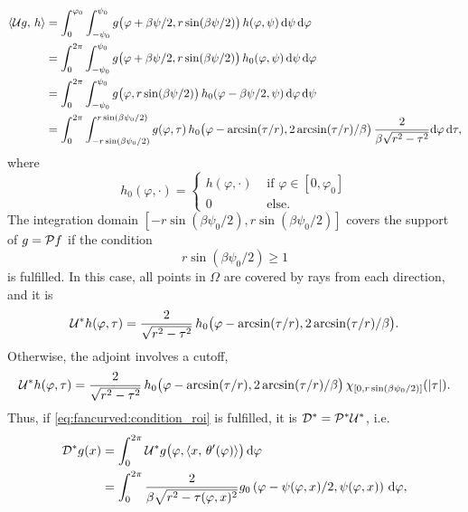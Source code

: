 \documentclass{amsart}
\renewcommand*{\phi}{\varphi}
\begin{document}
%
\begin{align*}
 \INNER{\OPU g}{h} 
 &= \int_0^{\phi_0} \int_{-\psi_0}^{\psi_0} g\big(\phi + \beta\psi/2, r\sin(\beta\psi/2)\big)\, h(\phi, \psi)\, \D\psi\, \D\phi \\
 &= \int_0^{2\pi} \int_{-\psi_0}^{\psi_0} g\big(\phi + \beta\psi/2, r\sin(\beta\psi/2)\big)\, h_0(\phi, \psi)\, \D\psi\, \D\phi \\
 &= \int_0^{2\pi} \int_{-\psi_0}^{\psi_0} g\big(\phi, r\sin(\beta\psi/2)\big)\, h_0(\phi - \beta\psi/2, \psi)\, \D\phi\, \D\psi \\
 &= \int_0^{2\pi} \int_{-r\sin(\beta\psi_0/2)}^{r\sin(\beta\psi_0/2)} g(\phi, \tau)\, h_0\big(\phi - \arcsin(\tau/r), 
 2\arcsin(\tau/r)/\beta\big)\, \frac{2}{\beta\sqrt{r^2-\tau^2}} \D\phi\, \D\tau,
\end{align*}
%
where
%
\begin{equation*}
 h_0(\phi, \cdot) =
 \begin{cases}
  h(\phi, \cdot) & \text{ if } \phi \in [0,\phi_0] \\
  0 & \text{ else}.
 \end{cases}
\end{equation*}
%
The integration domain $[-r\sin(\beta\psi_0/2), r\sin(\beta\psi_0/2)]$ covers the support of $g = {\mathcal{P}} f$ if the condition
%
\begin{equation}
 \label{eq:fancurved:condition_roi}
 r \sin(\beta\psi_0/2) \geq 1
\end{equation}
%
is fulfilled. In this case, all points in $\Omega$ are covered by rays from each direction, and it is
%
\begin{equation}
 \label{eq:fancurved:unit_trafo_adj_good}
 \DUALOPU h(\phi, \tau) = \frac{2}{\sqrt{r^2-\tau^2}} \, h_0\big(\phi - \arcsin(\tau/r), 2\arcsin(\tau/r)/\beta\big).
\end{equation}
%
Otherwise, the adjoint involves a cutoff,
%
\begin{equation}
 \label{eq:fancurved:unit_trafo_adj_bad}
 \DUALOPU h(\phi, \tau) = \frac{2}{\sqrt{r^2-\tau^2}} \, h_0\big(\phi - \arcsin(\tau/r), 2\arcsin(\tau/r)/\beta\big)\, 
 \chi_{[0, r\sin(\beta\psi_0/2)]}(\ABS{\tau}).
\end{equation}
%
Thus, if \eqref{eq:fancurved:condition_roi} is fulfilled, it is ${{\mathcal{D}}^*} = {{\mathcal{P}}^*}{{\mathcal{U}}^*}$, i.e.
%
\begin{align}
 \DUALOPD g(x)
 &= \int_0^{2\pi} \DUALOPU g\big(\phi, \INNER{x}{\theta'(\phi)}\big)\, \D\phi \notag\\
 \label{eq:fancurved:backproj}
 &= \int_0^{2\pi} \frac{2}{\beta\sqrt{r^2-\tau(\phi, x)^2}} g_0\left(\phi - \psi(\phi,x)/2, \psi(\phi,x) \right)\, \D\phi,
\end{align}
\end{document}

